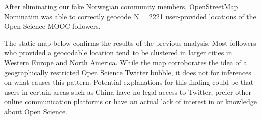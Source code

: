 \documentclass[]{article}
\newenvironment{Shaded}{\begin{snugshade}}{\end{snugshade}}
\newcommand{\KeywordTok}[1]{\textcolor[rgb]{0.13,0.29,0.53}{\textbf{#1}}}
\newcommand{\DataTypeTok}[1]{\textcolor[rgb]{0.13,0.29,0.53}{#1}}
\newcommand{\StringTok}[1]{\textcolor[rgb]{0.31,0.60,0.02}{#1}}
\newcommand{\CommentTok}[1]{\textcolor[rgb]{0.56,0.35,0.01}{\textit{#1}}}
\newcommand{\OtherTok}[1]{\textcolor[rgb]{0.56,0.35,0.01}{#1}}
\newcommand{\OperatorTok}[1]{\textcolor[rgb]{0.81,0.36,0.00}{\textbf{#1}}}
\newcommand{\NormalTok}[1]{#1}
\begin{document}
\begin{Shaded}
\end{Shaded}

After eliminating our fake Norwegian community members, OpenStreetMap
Nominatim was able to correctly geocode N = 2221 user-provided locations
of the Open Science MOOC followers.

The static map below confirms the results of the previous analysis. Most
followers who provided a geocodable location tend to be clustered in
larger cities in Western Europe and North America. While the map
corroborates the idea of a geographically restricted Open Science
Twitter bubble, it does not for inferences on what causes this pattern.
Potential explanations for this finding could be that users in certain
areas such as China have no legal access to Twitter, prefer other online
communication platforms or have an actual lack of interest in or
knowledge about Open Science.
\end{document}
